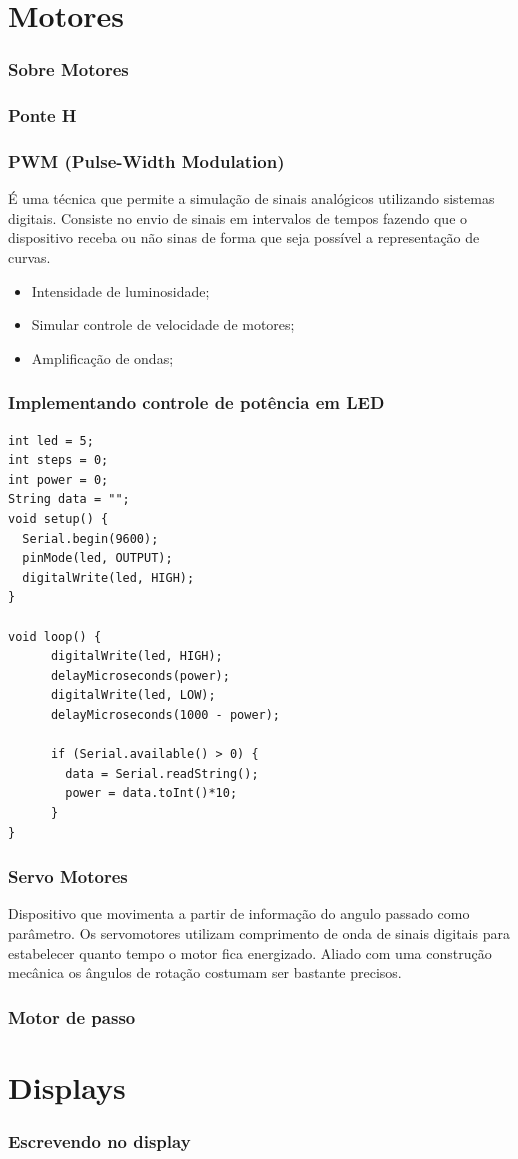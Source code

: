 \documentclass{beamer}
\begin{document}
\section{Motores}

\begin{frame}[fragile]
\frametitle{Sobre Motores}

\end{frame}


\begin{frame}[fragile]
\frametitle{Ponte H}

\end{frame}


\begin{frame}[fragile]
\frametitle{PWM (Pulse-Width Modulation)}

É uma técnica que permite a simulação de sinais analógicos utilizando sistemas digitais.
Consiste no envio de sinais em intervalos de tempos fazendo que o dispositivo receba ou não sinas
de forma que seja possível a representação de curvas.


\begin{itemize}
\item Intensidade de luminosidade;
\item Simular controle de velocidade de motores;
\item Amplificação de ondas;
\end{itemize}

\end{frame}


\begin{frame}[fragile]
\frametitle{Implementando controle de potência em LED}

\tiny
\begin{lstlisting}
int led = 5;
int steps = 0;
int power = 0;
String data = "";
void setup() {
  Serial.begin(9600);
  pinMode(led, OUTPUT);
  digitalWrite(led, HIGH);
}

void loop() {
      digitalWrite(led, HIGH);
      delayMicroseconds(power);
      digitalWrite(led, LOW);
      delayMicroseconds(1000 - power);
      
      if (Serial.available() > 0) {
        data = Serial.readString();
        power = data.toInt()*10;
      }      
}
\end{lstlisting}
\end{frame}




\begin{frame}[fragile]
\frametitle{Servo Motores}

Dispositivo que movimenta a partir de informação do angulo passado como parâmetro.
Os servomotores utilizam comprimento de onda de sinais digitais para estabelecer
quanto tempo o motor fica energizado. Aliado com uma construção mecânica os ângulos
de rotação costumam ser bastante precisos.

\end{frame}


\begin{frame}[fragile]
\frametitle{Motor de passo}

\end{frame}


\section{Displays}

\begin{frame}[fragile]
\frametitle{Escrevendo no display}

\end{frame}
\end{document}
